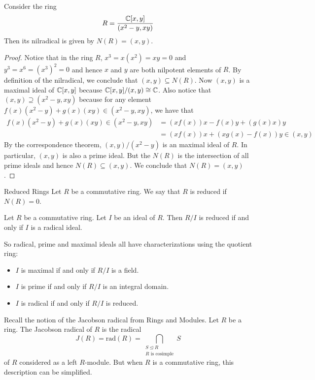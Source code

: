 \documentclass[a4paper]{article}
\begin{document}
\begin{eg}{}{} Consider the ring $$R=\frac{\mathbb{C}[x,y]}{(x^2-y,xy)}$$ Then its nilradical is given by $N(R)=(x,y)$. \tcbline
\begin{proof}
Notice that in the ring $R$, $x^3=x(x^2)=xy=0$ and $y^3=x^6=(x^3)^2=0$ and hence $x$ and $y$ are both nilpotent elements of $R$. By definition of the nilradical, we conclude that $(x,y)\subseteq N(R)$. Now $(x,y)$ is a maximal ideal of $\mathbb{C}[x,y]$ because $\mathbb{C}[x,y]/(x,y)\cong\mathbb{C}$. Also notice that $(x,y)\supseteq(x^2-y,xy)$ because for any element $f(x)(x^2-y)+g(x)(xy)\in(x^2-y,xy)$, we have that 
\begin{align*}
f(x)(x^2-y)+g(x)(xy)\in(x^2-y,xy)&=(xf(x))x-f(x)y+(g(x)x)y\\
&=(xf(x))x+(xg(x)-f(x))y\in (x,y)
\end{align*}
By the correspondence theorem, $(x,y)/(x^2-y)$ is an maximal ideal of $R$. In particular, $(x,y)$ is also a prime ideal. But the $N(R)$ is the intersection of all prime ideals and hence $N(R)\subseteq(x,y)$. We conclude that $N(R)=(x,y)$. 
\end{proof}
\end{eg}

\begin{defn}{Reduced Rings}{} Let $R$ be a commutative ring. We say that $R$ is reduced if $N(R)=0$. 
\end{defn}

\begin{prp}{}{} Let $R$ be a commutative ring. Let $I$ be an ideal of $R$. Then $R/I$ is reduced if and only if $I$ is a radical ideal. 
\end{prp}

So radical, prime and maximal ideals all have characterizations using the quotient ring: 
\begin{itemize}
\item $I$ is maximal if and only if $R/I$ is a field. 
\item $I$ is prime if and only if $R/I$ is an integral domain. 
\item $I$ is radical if and only if $R/I$ is reduced. 
\end{itemize}

Recall the notion of the Jacobson radical from Rings and Modules. Let $R$ be a ring. The Jacobson radical of $R$ is the radical $$J(R)=\text{rad}(R)=\bigcap_{\substack{S\trianglelefteq R\\R\text{ is cosimple}}}S$$ of $R$ considered as a left $R$-module. But when $R$ is a commutative ring, this description can be simplified. 
\end{document}
